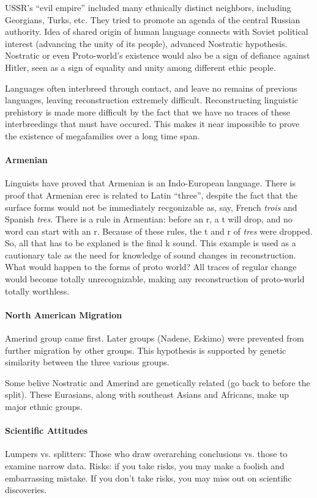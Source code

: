 \documentclass{exam}
\begin{document}
USSR's ``evil empire'' included many ethnically distinct neighbors, including Georgians, Turks, etc.
They tried to promote an agenda of the central Russian authority. 
Idea of shared origin of human language connects with Soviet political interest (advancing the unity of its people), advanced Nostratic hypothesis. 
Nostratic or even Proto-world's existence would also be a sign of defiance against Hitler, seen as a sign of equality and unity among different ethic people. 

Languages often interbreed through contact, and leave no remains of previous languages, leaving reconstruction extremely difficult.
Reconstructing linguistic prehistory is made more difficult by the fact that we have no traces of these interbreedings that must have occured.
This makes it near impossible to prove the existence of megafamilies over a long time span. 


\paragraph{Armenian}Linguists have proved that Armenian is an Indo-European language. 
There is proof that Armenian erec is related to Latin ``three'', despite the fact that the surface forms would not be immediately recgonizable as, say, French \textit{trois} and Spanish \textit{tres}. 
There is a rule in Armentian: before an r, a t will drop, and no word can start with an r. 
Because of these rules, the t and r of \textit{tres} were dropped. 
So, all that has to be explaned is the final k sound. 
This example is used as a cautionary tale as the need for knowledge of sound changes in reconstruction. 
What would happen to the forms of proto world? 
All traces of regular change would become totally unrecognizable, making any reconstruction of proto-world totally worthless. 

\paragraph{North American Migration}

Amerind group came first. 
Later groups (Nadene, Eskimo) were prevented from further migration by other groups. 
This hypothesis is supported by genetic similarity between the three various groups. 

Some belive Nostratic and Amerind are genetically related (go back to before the split).
These Eurasians, along with southeast Asians and Africans, make up major ethnic groups. 
\paragraph{Scientific Attitudes}Lumpers vs. splitters: Those who draw overarching conclusions vs. those to examine narrow data.  
Risks: if you take risks, you may make a foolish and embarrassing mistake. 
If you don't take risks, you may miss out on scientific discoveries. 
\end{document}
